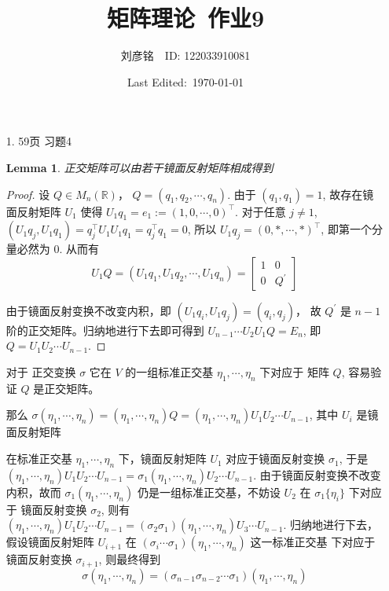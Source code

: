 \documentclass{article}
\title{矩阵理论\ 作业9}
\author{刘彦铭\ \ ID: 122033910081}
\date{Last Edited:\ \today}
\newtheorem{lemma}[theorem]{Lemma}
\begin{document}
\maketitle



\begin{spacing}{1.5}
\begin{itemize}
    \item [1.] 59页 习题4 
    
    \begin{lemma}
        正交矩阵可以由若干镜面反射矩阵相成得到
    \end{lemma}
    \begin{proof}
        设 $Q\in M_n(\mathbb{R})$， $Q=(q_1, q_2, \cdots, q_n)$. 由于 $(q_1, q_1) = 1$, 故存在镜面反射矩阵 $U_1$ 使得 $U_1 q_1 = e_1 := (1, 0, \cdots, 0)^\top$. 对于任意 $j\ne 1$, $(U_1q_j, U_1q_1) = q_j^\top U_1U_1 q_1 = q_j^\top q_1 = 0$, 所以 $U_1q_j = (0, *, \cdots, *)^\top$, 即第一个分量必然为 $0$. 从而有 $$U_1Q = (U_1q_1, U_1q_2, \cdots, U_1q_n) = \left[\begin{array}{cc}1&0\\0&Q^\prime\end{array}\right]$$

        由于镜面反射变换不改变内积，即 $(U_1q_i, U_1q_j) = (q_i, q_j)$， 故 $Q^\prime$ 是 $n-1$ 阶的正交矩阵。归纳地进行下去即可得到 $U_{n-1}\cdots U_2U_1Q = E_n$, 即 $Q = U_1U_2\cdots U_{n-1}$.
    \end{proof}

    对于 正交变换 $\sigma$ 它在 $V$ 的一组标准正交基 $\eta_1, \cdots, \eta_n$ 下对应于 矩阵 $Q$, 容易验证 $Q$ 是正交矩阵。

    那么 $\sigma(\eta_1, \cdots, \eta_n) = (\eta_1, \cdots, \eta_n) Q = (\eta_1, \cdots, \eta_n)U_1U_2\cdots U_{n-1} $, 其中 $U_i$ 是镜面反射矩阵

    在标准正交基 $\eta_1, \cdots, \eta_n$ 下，镜面反射矩阵 $U_1$ 对应于镜面反射变换 $\sigma_1$, 于是 $(\eta_1, \cdots, \eta_n)U_1U_2\cdots U_{n-1} = \sigma_1(\eta_1, \cdots, \eta_n) U_2\cdots U_{n-1}$. 由于镜面反射变换不改变内积，故而 $\sigma_1(\eta_1,\cdots,\eta_n)$ 仍是一组标准正交基，不妨设 $U_2$ 在 $\sigma_1\{\eta_i\}$ 下对应于 镜面反射变换 $\sigma_2$, 则有 $(\eta_1, \cdots,\eta_n)U_1U_2\cdots U_{n-1} = (\sigma_2\sigma_1)(\eta_1,\cdots,\eta_n)U_3\cdots U_{n-1}$. 归纳地进行下去，假设镜面反射矩阵 $U_{i+1}$ 在 $(\sigma_i\cdots \sigma_1)(\eta_1, \cdots, \eta_n)$ 这一标准正交基 下对应于 镜面反射变换 $\sigma_{i+1}$, 则最终得到 
    $$\sigma(\eta_1,\cdots,\eta_n) = (\sigma_{n-1}\sigma_{n-2}\cdots\sigma_1)(\eta_1,\cdots,\eta_n)$$


\end{itemize}
\end{spacing}
\end{document}
